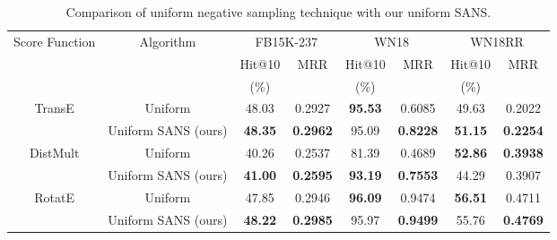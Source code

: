 \begin{table*}[h]
\begin{small}
\centering
\begin{tabular}{cccccccc}
\hline
\multirow{3}{2cm}{\centering Score Function}& \multirow{3}{2cm}{Algorithm} & \multicolumn{2}{c}{FB15K-237} & \multicolumn{2}{c}{WN18} & \multicolumn{2}{c}{WN18RR} \\
& & Hit@10 & \multirow{2}{1cm}{\centering MRR} & Hit@10 & \multirow{2}{1cm}{\centering MRR} & Hit@10 & \multirow{2}{1cm}{\centering MRR} \\ 
& & (\%) & & (\%) & & (\%) & \\
\hline
\multirow{2}{1.5cm}{\centering TransE} & Uniform \cite{sun2019rotate} & 48.03 & 0.2927 & \textbf{95.53} & 0.6085 & 49.63 & 0.2022 \\
&Uniform SANS (ours) & \textbf{48.35} & \textbf{0.2962} & 95.09 & \textbf{0.8228} & \textbf{51.15 }& \textbf{0.2254} \\
\hline
\multirow{2}{1.5cm}{\centering DistMult} & Uniform & 40.26 & 0.2537 & 81.39  & 0.4689 & \textbf{52.86} & \textbf{0.3938} \\
& Uniform SANS (ours) & \textbf{41.00} & \textbf{0.2595} & \textbf{93.19} & \textbf{0.7553} & 44.29 & 0.3907 \\
\hline
\multirow{2}{1cm}{\centering RotatE} & Uniform & 47.85 & 0.2946 & \textbf{96.09} & 0.9474 & \textbf{56.51} & 0.4711 \\
& Uniform SANS (ours) & \textbf{48.22} & \textbf{0.2985} & 95.97 & \textbf{0.9499} & 55.76 & \textbf{0.4769} \\
\hline
\end{tabular}
\caption{Comparison of uniform negative sampling technique with our uniform SANS. 
}
\label{tab:comp_uni}
\end{small}
\end{table*}
